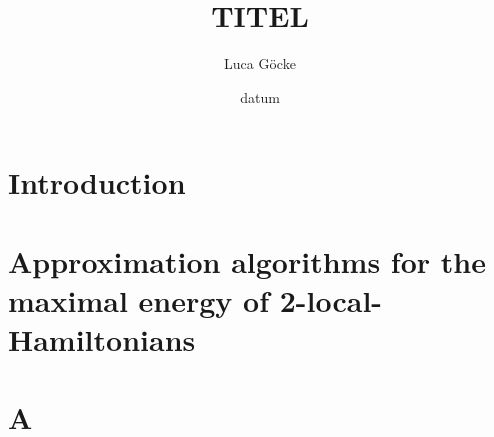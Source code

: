 \documentclass[pstricks,siunitx,theorem,british]{tumphthesis}
\title{TITEL}
\author{Luca Göcke}
\date{datum}
\begin{document}

\frontmatter
\maketitle
\tableofcontents

\mainmatter
\chapter{Introduction}



\chapter{Approximation algorithms for the maximal energy of 2-local-Hamiltonians}

\appendix
\chapter{A}

\backmatter
\printbibliography
\end{document}
